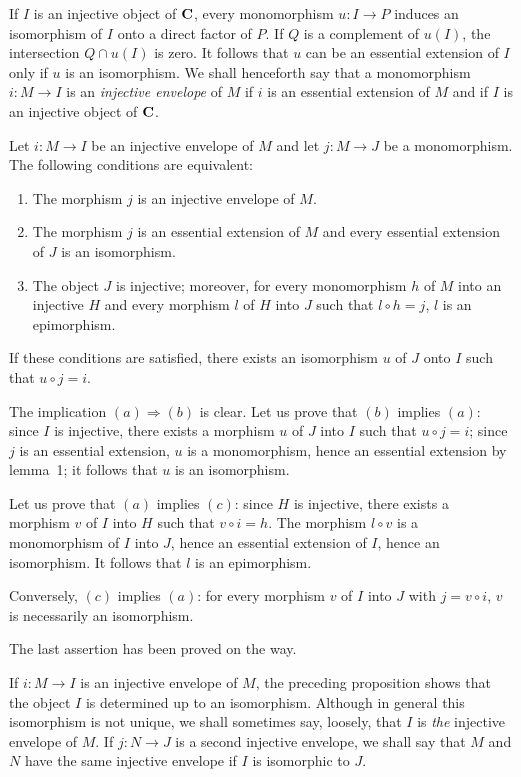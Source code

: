 If $I$ is an injective object of $\mathbf{C}$, every monomorphism
$u\colon I\to P$ induces an isomorphism of $I$ onto a direct factor of
$P$. If $Q$ is a complement of $u(I)$, the intersection $Q\cap u(I)$ is
zero. It follows that $u$ can be an essential extension of $I$ only if
$u$ is an isomorphism. We shall henceforth say that a monomorphism
$i\colon M\to I$ is an \emph{injective envelope} of $M$ if $i$ is an
essential extension of $M$ and if $I$ is an injective object of $\mathbf{C}$.

\begin{proposition}
Let $i\colon M\to I$ be an injective envelope of $M$ and let
$j\colon M\to J$ be a monomorphism. The following conditions are
equivalent:
\begin{enumerate}
\item[a.] The morphism $j$ is an injective envelope of $M$.
\item[b.] The morphism $j$ is an essential extension of $M$ and every
      essential extension of $J$ is an isomorphism.
\item[c.] The object $J$ is injective; moreover, for every monomorphism
      $h$ of $M$ into an injective $H$ and every morphism $l$ of $H$
      into $J$ such that $l\circ h = j$, $l$ is an epimorphism.
\end{enumerate}
If these conditions are satisfied, there exists an isomorphism $u$ of
$J$ onto $I$ such that $u\circ j = i$.
\end{proposition}

The implication $(a)\Rightarrow(b)$ is clear. Let us prove that $(b)$
implies $(a)$: since $I$ is injective, there exists a morphism $u$ of
$J$ into $I$ such that $u\circ j = i$; since $j$ is an essential
extension, $u$ is a monomorphism, hence an essential extension by
lemma~1; it follows that $u$ is an isomorphism.

Let us prove that $(a)$ implies $(c)$: since $H$ is injective, there
exists a morphism $v$ of $I$ into $H$ such that $v\circ i = h$. The
morphism $l\circ v$ is a monomorphism of $I$ into $J$, hence an
essential extension of $I$, hence an isomorphism. It follows that $l$ is
an epimorphism.

Conversely, $(c)$ implies $(a)$: for every morphism $v$ of $I$ into $J$
with $j = v\circ i$, $v$ is necessarily an isomorphism.

The last assertion has been proved on the way.

If $i\colon M\to I$ is an injective envelope of $M$, the preceding
proposition shows that the object $I$ is determined up to an
isomorphism. Although in general this isomorphism is not unique, we
shall sometimes say, loosely, that $I$ is \emph{the} injective envelope
of $M$. If $j\colon N\to J$ is a second injective envelope, we shall
say that $M$ and $N$ have the same injective envelope if $I$ is
isomorphic to $J$.

